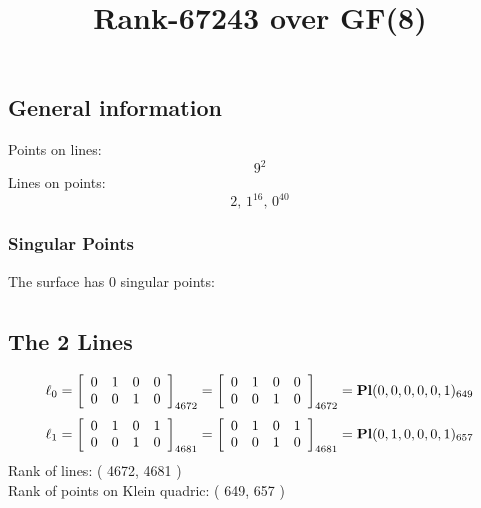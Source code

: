 \documentclass{article}
\newcommand\setTBstruts{\def\T{\rule{0pt}{2.6ex}}%
\def\B{\rule[-1.2ex]{0pt}{0pt}}}
\begin{document}
 
\setTBstruts



{\allowdisplaybreaks%






\title{Rank-67243 over GF(8)}
\author{}%
\maketitle%
%
{}



\subsection*{General information}
Points on lines:
$$
9^2$$
Lines on points:
$$
2,\,1^{16},\,0^{40}$$
\subsubsection*{Singular Points}
The surface has 0 singular points:\\
\begin{align*}
\end{align*}
\subsection*{The 2 Lines}
$$
\ell_{0} = 
\left[
\begin{array}{*{4}{r}}
0 & 1 & 0 & 0\\
0 & 0 & 1 & 0\\
\end{array}
\right]
_{4672}
=
\left[
\begin{array}{*{4}c}
0  & 1  & 0  & 0\\
0  & 0  & 1  & 0\\
\end{array}
\right]_{4672}
={\rm\bf Pl}(0,0,0,0,0,1 )_{649}$$
$$
\ell_{1} = 
\left[
\begin{array}{*{4}{r}}
0 & 1 & 0 & 1\\
0 & 0 & 1 & 0\\
\end{array}
\right]
_{4681}
=
\left[
\begin{array}{*{4}c}
0  & 1  & 0  & 1\\
0  & 0  & 1  & 0\\
\end{array}
\right]_{4681}
={\rm\bf Pl}(0,1,0,0,0,1 )_{657}$$
Rank of lines: ( 4672, 4681 )\\
Rank of points on Klein quadric: ( 649, 657 )\\
}
\end{document}
